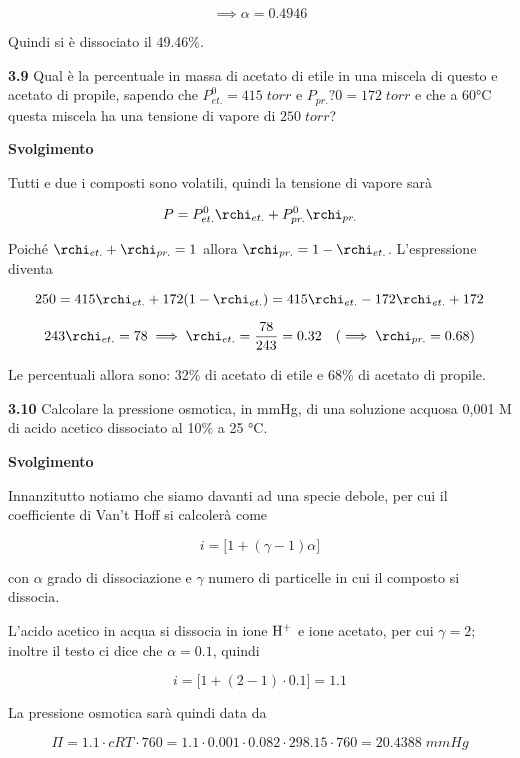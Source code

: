 $$\implies \alpha=0.4946$$

Quindi si è dissociato il 49.46\%.

\vspace{0.2cm}\textbf{3.9} Qual è la percentuale in massa di acetato di etile in una miscela di questo e acetato di propile, sapendo che $P_{et.}^0=415\;torr$ e $P_{pr.}?0=172\;torr$ e che a 60°C questa miscela ha una tensione di vapore di $250\;torr$?

\vspace{0.2cm}\large\textbf{Svolgimento}\normalsize

\vspace{0.2cm}Tutti e due i composti sono volatili, quindi la tensione di vapore sarà

$$P=P_{et.}^0\rchi_{et.} + P_{pr.}^0\rchi_{pr.}$$

Poiché $\rchi_{et.} + \rchi_{pr.}=1$ allora $\rchi_{pr.}=1 - \rchi_{et.}$. L'espressione diventa

$$250=415 \rchi_{et.} + 172(1 - \rchi_{et.})
=415 \rchi_{et.} - 172 \rchi_{et.} + 172$$

$$243\rchi_{et.}=78
\implies
\rchi_{et.}=\frac{78}{243}=0.32\quad(\implies \rchi_{pr.}=0.68)$$

Le percentuali allora sono: 32\% di acetato di etile e 68\% di acetato di propile.

\vspace{0.2cm}\textbf{3.10} Calcolare la pressione osmotica, in mmHg, di una soluzione acquosa 0,001 M di acido acetico dissociato al 10\% a 25 °C.

\vspace{0.2cm}\large\textbf{Svolgimento}\normalsize

\vspace{0.2cm}Innanzitutto notiamo che siamo davanti ad una specie debole, per cui il coefficiente di Van't Hoff si calcolerà come

$$i=\big[1 + (\gamma -1)\alpha\big]$$

con $\alpha$ grado di dissociazione e $\gamma$ numero di particelle in cui il composto si dissocia.

L'acido acetico in acqua si dissocia in ione $\rm H^+$ e ione acetato, per cui $\gamma=2$; inoltre il testo ci dice che $\alpha=0.1$, quindi

$$i=\big[1 + (2-1) \cdot 0.1\big]=1.1$$

La pressione osmotica sarà quindi data da

$$\Pi=1.1 \cdot cRT \cdot 760
=1.1 \cdot 0.001 \cdot 0.082 \cdot 298.15 \cdot 760=20.4388\;mmHg$$

